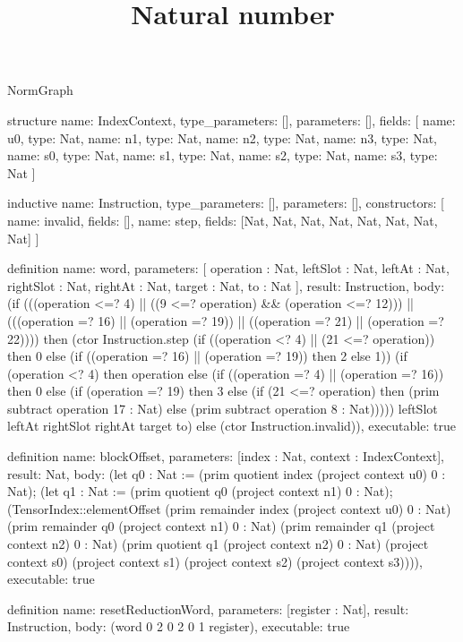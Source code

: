 \begin{lexlean}{NormGraph}
\title{Natural number}
\begin{semanticmodule}
structure{
  name: IndexContext,
  type_parameters: [],
  parameters: [],
  fields: [
    {name: u0, type: Nat},
    {name: n1, type: Nat},
    {name: n2, type: Nat},
    {name: n3, type: Nat},
    {name: s0, type: Nat},
    {name: s1, type: Nat},
    {name: s2, type: Nat},
    {name: s3, type: Nat}
  ]
}

inductive{
  name: Instruction,
  type_parameters: [],
  parameters: [],
  constructors: [
    {name: invalid, fields: []},
    {name: step, fields: [Nat, Nat, Nat, Nat, Nat, Nat, Nat, Nat]}
  ]
}

definition{
  name: word,
  parameters: [
    operation : Nat,
    leftSlot : Nat,
    leftAt : Nat,
    rightSlot : Nat,
    rightAt : Nat,
    target : Nat,
    to : Nat
  ],
  result: Instruction,
  body: (if (((operation <=? 4) || ((9 <=? operation) && (operation <=? 12))) || (((operation =? 16) || (operation =? 19)) || ((operation =? 21) || (operation =? 22)))) then (ctor Instruction.step (if ((operation <? 4) || (21 <=? operation)) then 0 else (if ((operation =? 16) || (operation =? 19)) then 2 else 1)) (if (operation <? 4) then operation else (if ((operation =? 4) || (operation =? 16)) then 0 else (if (operation =? 19) then 3 else (if (21 <=? operation) then (prim subtract operation 17 : Nat) else (prim subtract operation 8 : Nat))))) leftSlot leftAt rightSlot rightAt target to) else (ctor Instruction.invalid)),
  executable: true
}

definition{
  name: blockOffset,
  parameters: [index : Nat, context : IndexContext],
  result: Nat,
  body: (let q0 : Nat := (prim quotient index (project context u0) 0 : Nat); (let q1 : Nat := (prim quotient q0 (project context n1) 0 : Nat); (TensorIndex::elementOffset (prim remainder index (project context u0) 0 : Nat) (prim remainder q0 (project context n1) 0 : Nat) (prim remainder q1 (project context n2) 0 : Nat) (prim quotient q1 (project context n2) 0 : Nat) (project context s0) (project context s1) (project context s2) (project context s3)))),
  executable: true
}

definition{
  name: resetReductionWord,
  parameters: [register : Nat],
  result: Instruction,
  body: (word 0 2 0 2 0 1 register),
  executable: true
}


\end{semanticmodule}
\end{lexlean}

